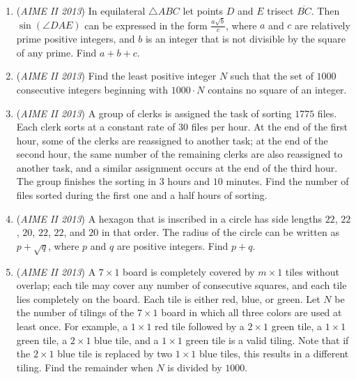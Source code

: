 \begin{enumerate}
 

	\item (\textit{AIME II 2013}) In equilateral $\triangle ABC$ let points $D$ and $E$ trisect $\overline{BC}$. Then $\sin(\angle DAE)$ can be expressed in the form $\frac{a\sqrt{b}}{c}$, where $a$ and $c$ are relatively prime positive integers, and $b$ is an integer that is not divisible by the square of any prime. Find $a+b+c$.


 

	\item (\textit{AIME II 2013}) Find the least positive integer $N$ such that the set of $1000$ consecutive integers beginning with $1000\cdot N$ contains no square of an integer.


 

	\item (\textit{AIME II 2013}) A group of clerks is assigned the task of sorting $1775$ files. Each clerk sorts at a constant rate of $30$ files per hour. At the end of the first hour, some of the clerks are reassigned to another task; at the end of the second hour, the same number of the remaining clerks are also reassigned to another task, and a similar assignment occurs at the end of the third hour. The group finishes the sorting in $3$ hours and $10$ minutes. Find the number of files sorted during the first one and a half hours of sorting.


 

	\item (\textit{AIME II 2013}) A hexagon that is inscribed in a circle has side lengths $22$, $22$, $20$, $22$, $22$, and $20$ in that order. The radius of the circle can be written as $p+\sqrt{q}$, where $p$ and $q$ are positive integers. Find $p+q$.


 

	\item (\textit{AIME II 2013}) A $7\times 1$ board is completely covered by $m\times 1$ tiles without overlap; each tile may cover any number of consecutive squares, and each tile lies completely on the board. Each tile is either red, blue, or green. Let $N$ be the number of tilings of the $7\times 1$ board in which all three colors are used at least once. For example, a $1\times 1$ red tile followed by a $2\times 1$ green tile, a $1\times 1$ green tile, a $2\times 1$ blue tile, and a $1\times 1$ green tile is a valid tiling. Note that if the $2\times 1$ blue tile is replaced by two $1\times 1$ blue tiles, this results in a different tiling. Find the remainder when $N$ is divided by $1000$.



\end{enumerate}
